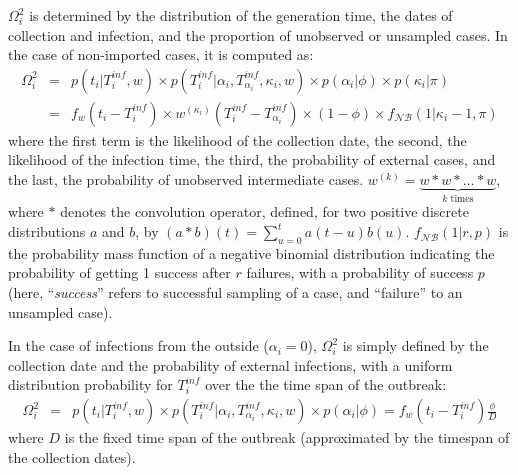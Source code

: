 \documentclass[10pt]{article}
\begin{document}
$\Omega_i^2$ is determined by the distribution of the generation time, the dates of collection and infection, and the proportion of unobserved or unsampled cases.
In the case of non-imported cases, it is computed as:
\begin{eqnarray}
 \Omega_i^2 & = & p(t_i | T_i^{inf}, w) \times p(T_i^{inf}| \alpha_i, T_{\alpha_i}^{inf}, \kappa_i, w)  
    \times p(\alpha_i | \phi) \times p(\kappa_i | \pi)\nonumber \\
& = &  f_w(t_i - T_i^{inf}) \times  w^{\left(\kappa_i\right)}(T_i^{inf} - T_{\alpha_i}^{inf})
  \times (1 -\phi) \times f_{\mathcal{NB}}(1 |\kappa_i-1, \pi)
\end{eqnarray}
where the first term is the likelihood of the collection date, the second, the likelihood of the infection time, the third, the probability of external cases, and the last, the probability of unobserved intermediate cases.
$w^{\left(k\right)} = \underbrace{w*w*\ldots*w}_{k \text{ times}} $, where $*$ denotes the convolution operator, defined, for two positive discrete distributions $a$ and $b$, by $\left(a*b\right)\left(t\right) = \sum_{u=0}^{t} a\left(t-u\right)b\left(u\right)$. 
$f_{\mathcal{NB}}(1 | r, p)$ is the probability mass function of a negative binomial distribution indicating the probability of getting 1 success after $r$ failures, with a probability of success $p$ (here, ``\textit{success}'' refers to successful sampling of a case, and ``failure'' to an unsampled case).


In the case of infections from the outside ($\alpha_i=0$), $\Omega_i^2$ is simply defined by the collection date and the probability of external infections, with a uniform distribution probability for $T_i^{inf}$ over the the time span of the outbreak:
\begin{eqnarray}
\Omega_i^2 & = & p(t_i | T_i^{inf}, w) \times p(T_i^{inf}| \alpha_i, T_{\alpha_i}^{inf}, \kappa_i, w) 
  \times p(\alpha_i | \phi) = f_w(t_i - T_i^{inf}) \frac{\phi}{D}
\end{eqnarray}
where $D$ is the fixed time span of the outbreak (approximated by the timespan of the collection dates).
\\
\end{document}
